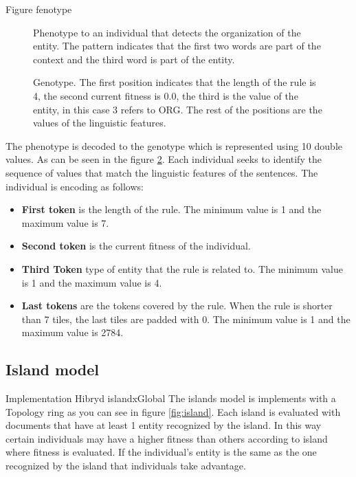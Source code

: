 Figure fenotype
\begin{figure}
  \centering%
  \caption{Phenotype to an individual that detects the organization of the entity. The pattern indicates that the first two words are part of the context and the third word is part of the entity.}
  \label{fig:fenotype}
\end{figure}


\begin{figure}[ht]
  \centering
  
  \caption{Genotype. The first position indicates that the length of the rule is 4, the second current fitness is 0.0, the third is the value of the entity, in this case 3 refers to ORG. The rest of the positions are the values of the linguistic features.}

  \label{fig:genotype}
\end{figure}

The phenotype is decoded to the genotype which is represented using 10 double values. As can be seen in the figure \ref{fig:genotype}. Each individual seeks to identify the sequence of values that match the linguistic features of the sentences. The individual is encoding as follows:

\begin{itemize}
  \item \textbf{First token} is the length of the rule. The minimum value is 1 and the maximum value is 7.
  \item \textbf{Second token} is the current fitness of the individual.
  \item \textbf{Third Token} type of entity that the rule is related to. The minimum value is 1 and the maximum value is 4.
  \item \textbf{Last tokens} are the tokens covered by the rule. When the rule is shorter than 7 tiles, the last tiles are padded with 0. The minimum value is 1 and the maximum value is 2784.
\end{itemize}

\subsection{Island model}

Implementation Hibryd islandxGlobal
The islands model is implements with a Topology ring as you can see in figure \ref{fig:island}. Each island is evaluated with documents that have at least 1 entity recognized by the island. In this way certain individuals may have a higher fitness than others according to island where fitness is evaluated. If the individual's entity is the same as the one recognized by the island that individuals take advantage.


